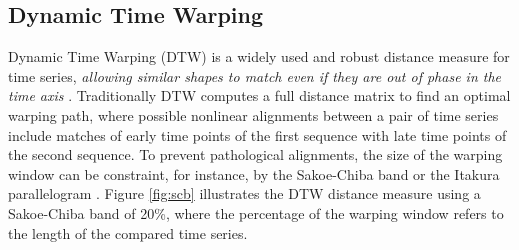 \subsection{Dynamic Time Warping} \label{dynamic_time_warping}

Dynamic Time Warping (DTW) is a widely used and robust distance measure for time series, \textit{allowing similar shapes to match even if they are out of phase in the time axis} \cite{keogh2002exact}. Traditionally DTW computes a full distance matrix to find an optimal warping path, where possible nonlinear alignments between a pair of time series include matches of early time points of the first sequence with late time points of the second sequence. To prevent pathological alignments, the size of the warping window can be constraint, for instance, by the Sakoe-Chiba band \cite{sakoe1978dynamic} or the Itakura parallelogram \cite{itakura1975minimum}. Figure \ref{fig:scb} illustrates the DTW distance measure using a Sakoe-Chiba band of 20\%, where the percentage of the warping window refers to the length of the compared time series.

